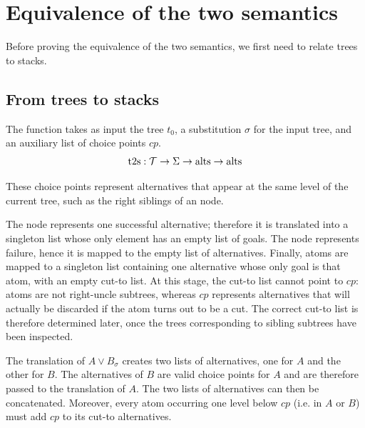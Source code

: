 \documentclass[sigplan,10pt,anonymous,review]{acmart}
\begin{document}
\section{Equivalence of the two semantics}

Before proving the equivalence of the two semantics, we first need
to relate trees to stacks.

\subsection{From trees to stacks}\label{sec:t2l}



The function \ttl takes as input the tree $t_0$, a substitution
$\sigma$ for the input tree, and an auxiliary list of choice points $cp$.
%
$$
\mathrm{{t2s}} : \mathcal{T} \to \Sigma \to \mathrm{alts} \to \mathrm{alts}
$$

These choice points
represent alternatives that appear at the same level of the current
tree, such as the right siblings of an \orC{} node.

The \okC node represents one successful alternative; therefore it is translated
into a singleton list whose only element has an empty list of goals. The \koC
node represents failure, hence it is mapped to the empty list of alternatives.
Finally, atoms are mapped to a singleton list containing one alternative whose
only goal is that atom, with an empty cut-to list.
At this stage, the cut-to list cannot point to $cp$: atoms are not
right-uncle subtrees, whereas $cp$ represents alternatives that will actually
be discarded if the atom turns out to be a cut. The correct cut-to list is
therefore determined later, once the trees corresponding to sibling subtrees
have been inspected.

The translation of $A \lor B_\sigma$ creates two lists of alternatives,
one for $A$ and the other for $B$. The alternatives of $B$ are valid
choice points for $A$ and are therefore passed to the translation of $A$.
The two lists of alternatives can then be concatenated. Moreover, every atom
occurring one level below $cp$ (i.e. in $A$ or $B$) must add $cp$ to its
cut-to alternatives.
\end{document}
